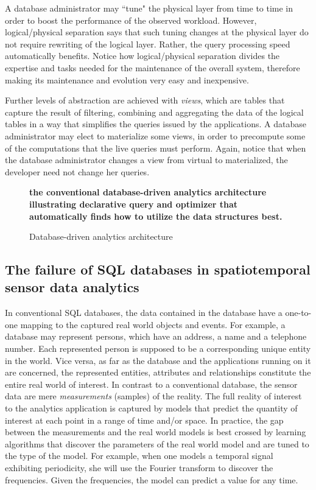 A database administrator may ``tune" the physical layer from time to time in order to boost the performance of the observed workload. However, logical/physical separation says that such tuning changes at the physical layer do not require rewriting of the logical layer. Rather, the query processing speed automatically benefits. Notice how logical/physical separation divides the expertise and tasks needed for the maintenance of the overall system, therefore making its maintenance and evolution very easy and inexpensive.

Further levels of abstraction are achieved with {\em views}, which are tables that capture the result of filtering, combining and aggregating the data of the logical tables in a way that simplifies the queries issued by the applications. A database administrator may elect to materialize some views, in order to precompute some of the computations that the live queries must perform. Again, notice that when the database administrator changes a view from virtual to materialized, the developer need not change her queries.

\begin{figure}
{\bf the conventional database-driven analytics architecture illustrating declarative query and optimizer that automatically finds how to utilize the data structures best.}
\caption{Database-driven analytics architecture}
\label{fig:db-driven-arch}
\end{figure}

\subsection{The failure of SQL databases in spatiotemporal sensor data analytics}
\label{sec:the-failure}
In conventional SQL databases, the data contained in the database have a one-to-one mapping to the captured real world objects and events. For example, a database may represent persons, which have an address, a name and a telephone number. Each represented person is supposed to be a corresponding unique entity in the world. Vice versa, as far as the database and the applications running on it are concerned, the represented entities, attributes and relationships constitute the entire real world of interest. In contrast to a conventional database, the sensor data are mere {\em measurements} (samples) of the reality. The full reality of interest to the analytics application is captured by models that predict the quantity of interest at each point in a range of time and/or space. In practice, the gap between the measurements and the real world models is best crossed by learning algorithms that discover the parameters of the real world model and are tuned to the type of the model. For example, when one models a temporal signal exhibiting periodicity, she will use the Fourier transform to discover the frequencies. Given the frequencies, the model can predict a value for any time.

